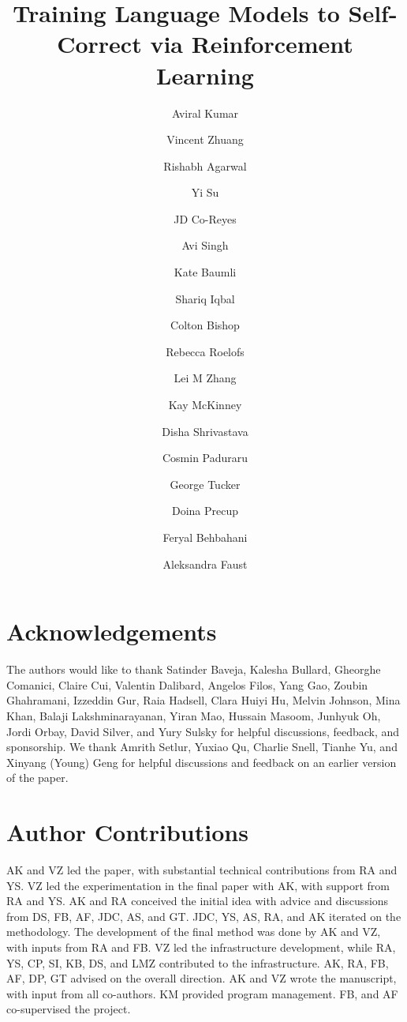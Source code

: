 \documentclass[11pt, letterpaper, logo, onecolumn, numbering]{googledeepmind}
\title{Training Language Models to Self-Correct via Reinforcement Learning}
\author[*+,1]{Aviral Kumar}
\author[*+,1]{Vincent Zhuang}
\author[*,1]{Rishabh Agarwal}
\author[*,1]{Yi Su}
\author[]{JD Co-Reyes}
\author[]{Avi Singh}
\author[]{Kate Baumli}
\author[]{Shariq Iqbal}
\author[]{Colton Bishop}
\author[]{Rebecca Roelofs}
\author[]{Lei M Zhang}
\author[]{Kay McKinney}
\author[]{Disha Shrivastava}
\author[]{Cosmin Paduraru}
\author[]{George Tucker}
\author[]{Doina Precup}
\author[$\dagger$,1]{Feryal Behbahani}
\author[$\dagger$,1]{Aleksandra Faust}
\affil[1]{Google DeepMind}
\affil[*]{Equal Contribution}
\affil[+]{Randomly ordered via coin flip}
\affil[$\dagger$]{Jointly supervised.}
\begin{document}
\maketitle









\vspace{-0.2cm}
\section*{Acknowledgements}
\vspace{-0.2cm}
The authors would like to thank Satinder Baveja, Kalesha Bullard, Gheorghe Comanici, Claire Cui, Valentin Dalibard, Angelos Filos, Yang Gao, Zoubin Ghahramani, Izzeddin Gur, Raia Hadsell, Clara Huiyi Hu, Melvin Johnson, Mina Khan, Balaji Lakshminarayanan, Yiran Mao, Hussain Masoom, Junhyuk Oh, Jordi Orbay, David Silver, and Yury Sulsky for helpful discussions, feedback, and sponsorship. We thank Amrith Setlur, Yuxiao Qu, Charlie Snell, Tianhe Yu, and Xinyang (Young) Geng for helpful discussions and feedback on an earlier version of the paper.

\vspace{-0.2cm}
\section*{Author Contributions}
\vspace{-0.2cm}
AK and VZ led the paper, with substantial technical contributions from RA and YS. VZ led the experimentation in the final paper with AK, with support from RA and YS. AK and RA conceived the initial idea with advice and discussions from DS, FB, AF, JDC, AS, and GT. JDC, YS, AS, RA, and AK iterated on the methodology. The development of the final method was done by AK and VZ, with inputs from RA and FB. VZ led the infrastructure development, while RA, YS, CP, SI, KB, DS, and LMZ contributed to the infrastructure. AK, RA, FB, AF, DP, GT advised on the overall direction. AK and VZ wrote the manuscript, with input from all co-authors. KM provided program management. FB, and AF co-supervised the project.



\appendix

\end{document}
